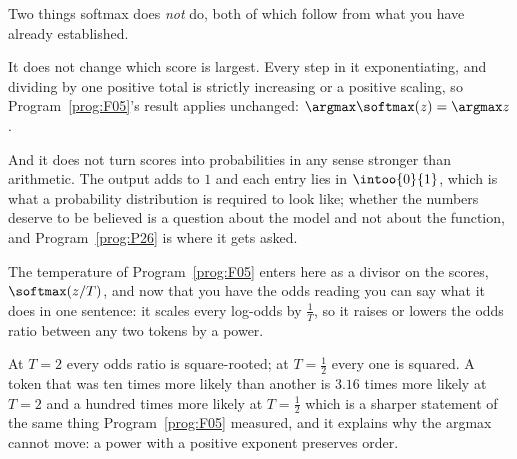\begin{fr}
Two things softmax does \emph{not} do, both of which follow from what you have
already established.

It does not change which score is largest. Every step in it \dash{}
exponentiating, and dividing by one positive total \dash{} is strictly
increasing or a positive scaling, so Program~\ref{prog:F05}'s result applies
unchanged: $\argmax \softmax(z) = \argmax z$.

And it does not turn scores into probabilities in any sense stronger than
arithmetic. The output adds to $1$ and each entry lies in $\intoo{0}{1}$,
which is what a probability distribution is required to look like; whether the
numbers deserve to be believed is a question about the model and not about the
function, and Program~\ref{prog:P26} is where it gets asked.

\begin{aibox}
The temperature of Program~\ref{prog:F05} enters here as a divisor on the
scores, $\softmax(z/T)$, and now that you have the odds reading you can say
what it does in one sentence: it scales every log-odds by $\frac{1}{T}$, so it
raises or lowers the odds ratio between any two tokens by a power.

At $T = 2$ every odds ratio is square-rooted; at $T = \frac{1}{2}$ every one is
squared. A token that was ten times more likely than another is
$\num{3.16}$ times more likely at $T = 2$ and a hundred times more likely at
$T = \frac{1}{2}$ \dash{} which is a sharper statement of the same thing
Program~\ref{prog:F05} measured, and it explains why the argmax cannot move: a
power with a positive exponent preserves order.
\end{aibox}
\end{fr}

